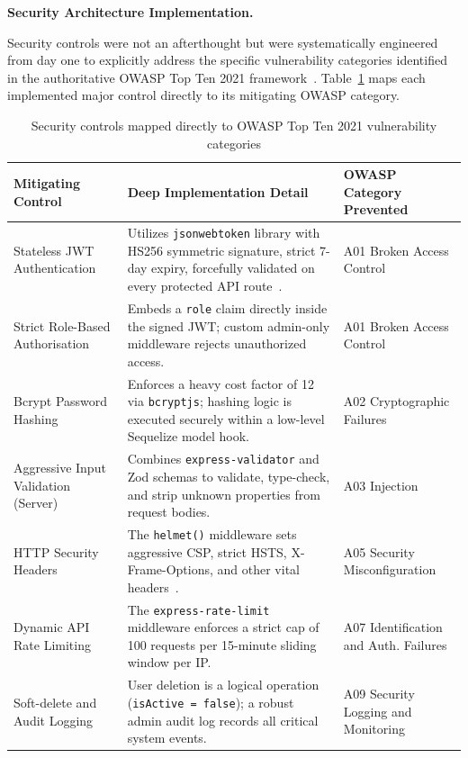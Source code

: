\textbf{Security Architecture Implementation.}

Security controls were not an afterthought but were systematically engineered from day one to explicitly address the specific vulnerability categories identified in the authoritative OWASP Top Ten 2021 framework~\cite{owasp2021}. Table~\ref{tab:security} maps each implemented major control directly to its mitigating OWASP category.

\begin{table}[H]
  \centering
  \begin{tabularx}{\linewidth}{>{\raggedright\arraybackslash}p{3.5cm} X >{\raggedright\arraybackslash}p{3.5cm}}
    \toprule
    \textbf{Mitigating Control} & \textbf{Deep Implementation Detail} & \textbf{OWASP Category Prevented} \\
    \midrule
    Stateless JWT Authentication  & Utilizes \texttt{jsonwebtoken} library with HS256 symmetric signature, strict 7-day expiry, forcefully validated on every protected API route~\cite{jwt2015}. & A01 Broken Access Control \\ 
    \addlinespace
    Strict Role-Based Authorisation & Embeds a \texttt{role} claim directly inside the signed JWT; custom admin-only middleware rejects unauthorized access. & A01 Broken Access Control \\
    \addlinespace
    Bcrypt Password Hashing   & Enforces a heavy cost factor of 12 via \texttt{bcryptjs}; hashing logic is executed securely within a low-level Sequelize model hook. & A02 Cryptographic Failures \\
    \addlinespace
    Aggressive Input Validation (Server) & Combines \texttt{express-validator} and Zod schemas to validate, type-check, and strip unknown properties from request bodies. & A03 Injection \\
    \addlinespace
    HTTP Security Headers     & The \texttt{helmet()} middleware sets aggressive CSP, strict HSTS, X-Frame-Options, and other vital headers~\cite{helmet2023}. & A05 Security Misconfiguration \\
    \addlinespace
    Dynamic API Rate Limiting   & The \texttt{express-rate-limit} middleware enforces a strict cap of 100 requests per 15-minute sliding window per IP. & A07 Identification and Auth. Failures \\
    \addlinespace
    Soft-delete and Audit Logging & User deletion is a logical operation (\texttt{isActive = false}); a robust admin audit log records all critical system events. & A09 Security Logging and Monitoring \\
    \bottomrule
  \end{tabularx}
    \small %
  \caption{Security controls mapped directly to OWASP Top Ten 2021 vulnerability categories}
  \label{tab:security}
\end{table}

